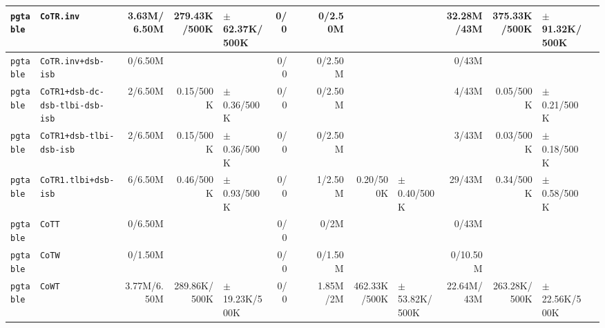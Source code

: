 \begin{tabular}{l l  | r r l | r r l | r r l | r r l l}
        \verb|pgtable| &                                             \verb|CoTR.inv| &    3.63M/6.50M &          279.43K/500K & $\pm$ 62.37K/500K &            0/0 &                       &  &        0/2.50M &                       &                   &     32.28M/43M &          375.33K/500K &  $\pm$ 91.32K/500K & \\ \hline 
        \verb|pgtable| &                                     \verb|CoTR.inv+dsb-isb| &        0/6.50M &                       &                   &            0/0 &                       &  &        0/2.50M &                       &                   &          0/43M &                       &                    & \\ \hline 
        \verb|pgtable| &                        \verb|CoTR1+dsb-dc-dsb-tlbi-dsb-isb| &        2/6.50M &             0.15/500K &   $\pm$ 0.36/500K &            0/0 &                       &  &        0/2.50M &                       &                   &          4/43M &             0.05/500K &    $\pm$ 0.21/500K & \\ \hline 
        \verb|pgtable| &                               \verb|CoTR1+dsb-tlbi-dsb-isb| &        2/6.50M &             0.15/500K &   $\pm$ 0.36/500K &            0/0 &                       &  &        0/2.50M &                       &                   &          3/43M &             0.03/500K &    $\pm$ 0.18/500K & \\ \hline 
        \verb|pgtable| &                                   \verb|CoTR1.tlbi+dsb-isb| &        6/6.50M &             0.46/500K &   $\pm$ 0.93/500K &            0/0 &                       &  &        1/2.50M &             0.20/500K &   $\pm$ 0.40/500K &         29/43M &             0.34/500K &    $\pm$ 0.58/500K & \\ \hline 
        \verb|pgtable| &                                                 \verb|CoTT| &        0/6.50M &                       &                   &            0/0 &                       &  &           0/2M &                       &                   &          0/43M &                       &                    & \\ \hline 
        \verb|pgtable| &                                                 \verb|CoTW| &        0/1.50M &                       &                   &            0/0 &                       &  &        0/1.50M &                       &                   &       0/10.50M &                       &                    & \\ \hline 
        \verb|pgtable| &                                                 \verb|CoWT| &    3.77M/6.50M &          289.86K/500K & $\pm$ 19.23K/500K &            0/0 &                       &  &       1.85M/2M &          462.33K/500K & $\pm$ 53.82K/500K &     22.64M/43M &          263.28K/500K &  $\pm$ 22.56K/500K & \\ \hline 

\end{tabular}

